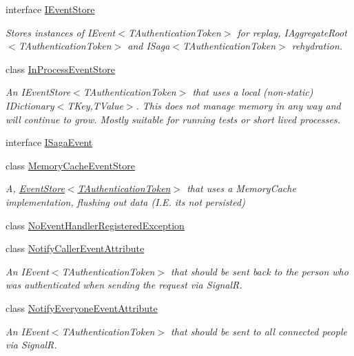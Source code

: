 \begin{DoxyCompactItemize}
interface \hyperlink{interfaceCqrs_1_1Events_1_1IEventStore}{I\+Event\+Store}
\begin{DoxyCompactList}\small\item\em Stores instances of I\+Event$<$\+T\+Authentication\+Token$>$ for replay, I\+Aggregate\+Root$<$\+T\+Authentication\+Token$>$ and I\+Saga$<$\+T\+Authentication\+Token$>$ rehydration. \end{DoxyCompactList}\item 
class \hyperlink{classCqrs_1_1Events_1_1InProcessEventStore}{In\+Process\+Event\+Store}
\begin{DoxyCompactList}\small\item\em An I\+Event\+Store$<$\+T\+Authentication\+Token$>$ that uses a local (non-\/static) I\+Dictionary$<$\+T\+Key,\+T\+Value$>$. This does not manage memory in any way and will continue to grow. Mostly suitable for running tests or short lived processes. \end{DoxyCompactList}\item 
interface \hyperlink{interfaceCqrs_1_1Events_1_1ISagaEvent}{I\+Saga\+Event}
\item 
class \hyperlink{classCqrs_1_1Events_1_1MemoryCacheEventStore}{Memory\+Cache\+Event\+Store}
\begin{DoxyCompactList}\small\item\em A, \hyperlink{classCqrs_1_1Events_1_1EventStore_a6346cb2aea4c5b4e740dc6cfb15abab8_a6346cb2aea4c5b4e740dc6cfb15abab8}{Event\+Store$<$\+T\+Authentication\+Token$>$} that uses a Memory\+Cache implementation, flushing out data (I.\+E. it\textquotesingle{}s not persisted) \end{DoxyCompactList}\item 
class \hyperlink{classCqrs_1_1Events_1_1NoEventHandlerRegisteredException}{No\+Event\+Handler\+Registered\+Exception}
\item 
class \hyperlink{classCqrs_1_1Events_1_1NotifyCallerEventAttribute}{Notify\+Caller\+Event\+Attribute}
\begin{DoxyCompactList}\small\item\em An I\+Event$<$\+T\+Authentication\+Token$>$ that should be sent back to the person who was authenticated when sending the request via SignalR. \end{DoxyCompactList}\item 
class \hyperlink{classCqrs_1_1Events_1_1NotifyEveryoneEventAttribute}{Notify\+Everyone\+Event\+Attribute}
\begin{DoxyCompactList}\small\item\em An I\+Event$<$\+T\+Authentication\+Token$>$ that should be sent to all connected people via SignalR. \end{DoxyCompactList}\item 

\end{DoxyCompactItemize}
